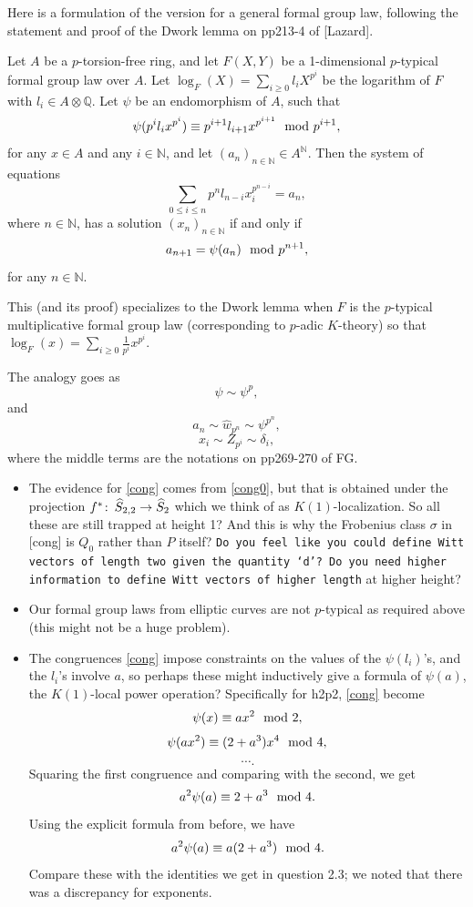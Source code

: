 \documentclass{rs}
\theoremstyle{definition}
\theoremstyle{remark}
\def\co{\colon\thinspace}
\newcommand{\mb}[1]{\mathbb{#1}}
\newcommand{\md}{~~{\rm mod}~}
\renewcommand{\=}{\approx}
\renewcommand{\-}{\sim}
\numberwithin{equation}{section}
\numberwithin{thm}{section}
\begin{document}
Here is a formulation of the version for a general formal group law, following the statement and proof of the Dwork lemma on pp213-4 of [Lazard].

Let $A$ be a $p$-torsion-free ring, and let $F(X,Y)$ be a 1-dimensional $p$-typical formal group law over $A$. 
Let $\log_F(X) = \sum_{i \geq 0} l_i X^{p^i}$ be the logarithm of $F$ with $l_i \in A \otimes {\mb Q}$. 
Let $\psi$ be an endomorphism of $A$, such that 
\begin{equation}
\label{cong}
 \psi(p^i l_i x^{p^i}) \equiv p^{i+1} l_{i+1} x^{p^{i+1}} \md p^{i+1},
\end{equation}
for any $x \in A$ and any $i \in {\mb N}$, and let $(a_n)_{n \in {\mb N}} \in A^{\mb N}$. 
Then the system of equations 
\[
 \sum_{0 \leq i \leq n} p^n l_{n-i} x_i^{p^{n-i}} = a_n,
\]
where $n \in {\mb N}$, has a solution $(x_n)_{n \in {\mb N}}$ if and only if 
\[
 a_{n+1} = \psi(a_n) \md p^{n+1},
\]
for any $n \in {\mb N}$.

This (and its proof) specializes to the Dwork lemma when $F$ is the $p$-typical multiplicative formal group law (corresponding to $p$-adic $K$-theory) 
so that $\log_F(x) = \sum_{i \geq 0} \frac{1}{p^i} x^{p^i}$. 

The analogy goes as 
\[
 \psi \sim \psi^p,
\]
and
\[
 a_n \sim \hat{w}_{p^n} \sim \psi^{p^n},
\]
\[
 x_i \sim Z_{p^i} \sim \delta_i,
\]
where the middle terms are the notations on pp269-270 of FG.

\begin{itemize}
 \item The evidence for \eqref{cong} comes from \eqref{cong0}, but that is obtained under the projection $f^* \co \widehat{S}_{2,2} \to \widehat{S}_2$ 
 which we think of as $K(1)$-localization. So all these are still trapped at height 1? And this is why the Frobenius class $\sigma$ in [cong] is $Q_0$ rather than $P$ itself? 
 \texttt{Do you feel like you could define Witt vectors of length two given the quantity `$d$'? 
 Do you need higher information to define Witt vectors of higher length} at higher height?

 \item Our formal group laws from elliptic curves are not $p$-typical as required above (this might not be a huge problem).

 \item The congruences \eqref{cong} impose constraints on the values of the $\psi(l_i)$'s, and the $l_i$'s involve $a$, 
 so perhaps these might inductively give a formula of $\psi(a)$, the $K(1)$-local power operation?
 Specifically for h2p2, \eqref{cong} become 
 \[
  \psi(x) \equiv a x^2 \md 2,
 \]
 \[
  \psi(a x^2) \equiv (2 + a^3) x^4 \md 4,
 \]
 \[
  \cdots.
 \]
 Squaring the first congruence and comparing with the second, we get 
 \[
  a^2 \psi(a) \equiv 2 + a^3 \md 4.
 \]
 Using the explicit formula from before, we have 
 \[
  a^2 \psi(a) \equiv a (2 + a^3) \md 4.
 \]
 Compare these with the identities we get in question 2.3; we noted that there was a discrepancy for exponents.
\end{itemize}
\end{document}
